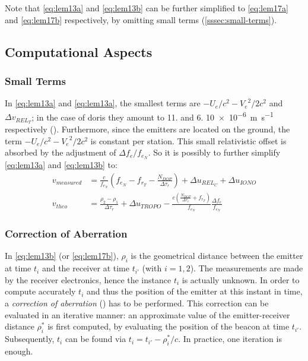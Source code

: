 Note that \autoref{eq:lem13a} and \autoref{eq:lem13b} can be further simplified 
to \autoref{eq:lem17a} and \autoref{eq:lem17b} respectively, by 
omitting small terms (\autoref{sssec:small-terms}).

\subsection{Computational Aspects}\label{ssec:doris-computational-aspects}

\subsubsection{Small Terms}\label{sssec:small-terms}
In \autoref{eq:lem13a} and \autoref{eq:lem13a}, the smallest terms are $-U_e / c^2 - {V_e}^2 / 2 c^2$ and 
$\Delta v_{{REL}_T}$; in the case of \gls{doris} they amount to \num{11.} and 
\num{6.} \SI{10e-6}{\meter\per\second} respectively (\cite{Lemoine2016}). 
Furthermore, since the emitters are located on the ground, the term 
$-U_e / c^2 - {V_e}^2 / 2 c^2$ is constant per station. This small 
relativistic offset is absorbed by the adjustment of $\Delta f_e / f_{e_N}$. 
So it is possibly to further simplify \autoref{eq:lem13a} and \autoref{eq:lem13b} 
to:
\begin{subequations}\label{eq:lem17}
    \begin{align}
        v_{measured} & = \frac{c}{f_{e_N}} (f_{e_N} - f_{r_T} -
          \frac{N_{DOP}}{\Delta\tau_r}) + 
          \Delta u_{{REL}_C} + \Delta u_{IONO} \label{eq:lem17a}\\
        v_{theo} &= \frac{\rho_2 - \rho_1}{\Delta\tau_r} + \Delta u_{TROPO} - 
          \frac{c(\frac{N_{DOP}}{\Delta\tau_r} + f_{r_T})}{f_{e_N}} 
          \frac{\Delta f_e}{f_{e_N}} \label{eq:lem17b}
    \end{align}
\end{subequations}

\subsubsection{Correction of Aberration}\label{sssec:doris-aberration}
In \autoref{eq:lem13b} (or \autoref{eq:lem17b}), $\rho _i$ is the geometrical distance 
between the emitter at time $t_i$ and the receiver at time $t_{i'}$ (with $i=1,2$). 
The measurements are made by the receiver electronics, hence the instance $t_i$ is 
actually unknown. In order to compute accurately $t_i$ and thus the position of 
the emitter at this instant in time, a \emph{correction of aberration} (\cite{Lemoine2016}) 
has to be performed. This correction can be evaluated in an iterative manner: an 
approximate value of the emitter-receiver distance $\rho ^{*} _i$ is first computed, 
by evaluating the position of the beacon at time $t_{i'}$. Subsequently, $t_i$ can be 
found via $t_i = t_{i'} - \rho ^{*} _i / c$. In practice, one iteration is enough.

